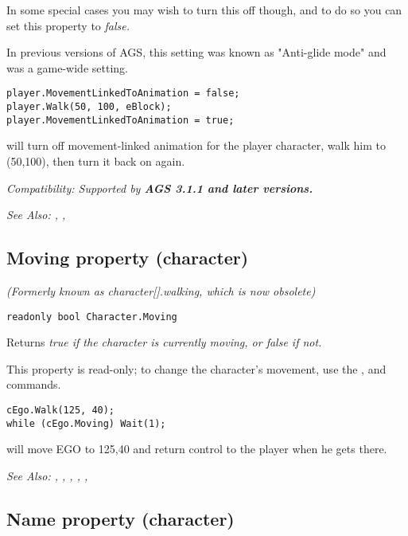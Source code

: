 In some special cases you may wish to turn this off though, and to do so you can set this
property to \it{false}.

In previous versions of AGS, this setting was known as "Anti-glide mode" and was a game-wide
setting.

\begin{verbatim}
player.MovementLinkedToAnimation = false;
player.Walk(50, 100, eBlock);
player.MovementLinkedToAnimation = true;
\end{verbatim}
will turn off movement-linked animation for the player character, walk him to (50,100),
then turn it back on again.

\it{Compatibility:} Supported by \bf{AGS 3.1.1} and later versions.

\it{See Also:}
,
,


\subsection{Moving property (character)}\label{Character.Moving}%

\it{(Formerly known as character[].walking, which is now obsolete)}

\begin{verbatim}
readonly bool Character.Moving
\end{verbatim}
Returns \it{true} if the character is currently moving, or \it{false} if not.

This property is read-only; to change the character's movement, use the ,
 and  commands.

\begin{verbatim}
cEgo.Walk(125, 40);
while (cEgo.Moving) Wait(1);
\end{verbatim}
will move EGO to 125,40 and return control to the player when he gets there.

\it{See Also:} ,
,
,
,
,


\subsection{Name property (character)}\label{Character.Name}%

